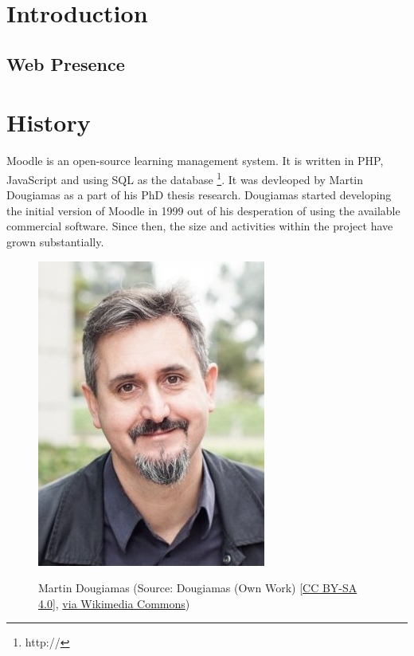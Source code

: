 \documentclass{article}
\begin{document}
\section{Introduction} %
\label{sec:introduction}





\subsection{Web Presence} %
\label{sub:web_presence}


\section{History} %
\label{sec:history}

Moodle is an open-source learning management system. It is written in PHP, JavaScript and using SQL as the database \footnote{http://}. It was devleoped by Martin Dougiamas as a part of his PhD thesis research. Dougiamas started developing the initial version of Moodle in 1999 out of his desperation of using the available commercial software. Since then, the size and activities within the project have grown substantially.

\begin{figure}[h!]
	\centering
	\includegraphics[scale=0.5]{Martin-Dougiamas.jpg}
	\label{fig:martin}
	\caption{Martin Dougiamas (Source: Dougiamas (Own Work) [\href{http://creativecommons.org/licenses/by-sa/4.0}{CC BY-SA 4.0}],
	\href{https://commons.wikimedia.org/wiki/File\%3AMartin-Dougiamas.jpg}{via Wikimedia Commons})}
\end{figure}
\end{document}
